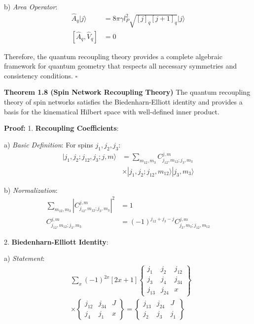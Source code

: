 \documentclass[12pt,a4paper]{article}
\begin{document}
   b) \textit{Area Operator}:
      \[
      \begin{aligned}
      \hat{A}_q|j\rangle &= 8\pi\gamma l_P^2\sqrt{[j]_q[j+1]_q}|j\rangle \\
      [\hat{A}_q, \hat{V}_q] &= 0
      \end{aligned}
      \]

Therefore, the quantum recoupling theory provides a complete algebraic framework for quantum geometry that respects all necessary symmetries and consistency conditions. $\square$

\textbf{Theorem 1.8 (Spin Network Recoupling Theory)}
The quantum recoupling theory of spin networks satisfies the Biedenharn-Elliott identity and provides a basis for the kinematical Hilbert space with well-defined inner product.

\textbf{Proof:}
1. \textbf{Recoupling Coefficients}:
   
   a) \textit{Basic Definition}:
      For spins $j_1, j_2, j_3$:
      \[
      \begin{aligned}
      |j_1,j_2;j_{12},j_3;j,m\rangle &= \sum_{m_{12},m_3} C^{j,m}_{j_{12},m_{12};j_3,m_3} \\
      &\times |j_1,j_2;j_{12},m_{12}\rangle|j_3,m_3\rangle
      \end{aligned}
      \]
   
   b) \textit{Normalization}:
      \[
      \begin{aligned}
      \sum_{m_{12},m_3} |C^{j,m}_{j_{12},m_{12};j_3,m_3}|^2 &= 1 \\
      C^{j,m}_{j_{12},m_{12};j_3,m_3} &= (-1)^{j_{12}+j_3-j}C^{j,m}_{j_3,m_3;j_{12},m_{12}}
      \end{aligned}
      \]

2. \textbf{Biedenharn-Elliott Identity}:
   
   a) \textit{Statement}:
      \[
      \begin{aligned}
      &\sum_{x} (-1)^{2x} [2x+1] 
      \begin{Bmatrix} 
      j_1 & j_2 & j_{12} \\
      j_3 & j_4 & j_{34} \\
      j_{13} & j_{24} & x
      \end{Bmatrix} \\
      &\times \begin{Bmatrix}
      j_{12} & j_{34} & J \\
      j_4 & j_1 & x
      \end{Bmatrix} = 
      \begin{Bmatrix}
      j_{13} & j_{24} & J \\
      j_2 & j_3 & j_1
      \end{Bmatrix}
      \end{aligned}
      \]
   
\end{document}

